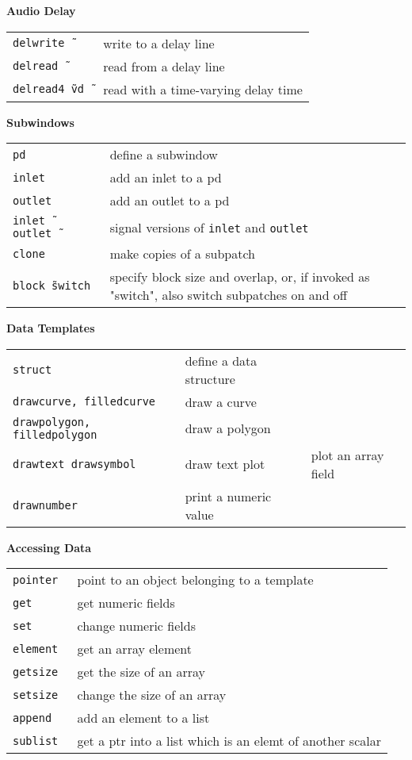 \documentclass[a4paper, landscape, 10pt]{article}
\newcommand{\refcardtitle}[1]{
  \begin{center}
    \textbf{\small{#1}}
  \end{center}
}
\begin{document}
\begin{multicols}{3}
  \refcardtitle{Audio Delay}
  \begin{tabularx}{9cm}{>{\tt}l X}
    delwrite\~\ & write to a delay line \\
    delread\~\ & read from a delay line \\
    delread4\~\ vd\~\ & read with a time-varying delay time \\
  \end{tabularx}

  \refcardtitle{Subwindows}
  \begin{tabularx}{9cm}{>{\tt}l X}
    pd & define a subwindow \\
    inlet & add an inlet to a pd \\
    outlet & add an outlet to a pd \\
    inlet\~\, outlet\~\ & signal versions of \texttt{inlet} and \texttt{outlet} \\
    clone & make copies of a subpatch \\
    block\~\ switch & specify block size and overlap, or, if invoked as "switch", also switch subpatches on and off \\
  \end{tabularx}

  \refcardtitle{Data Templates}
  \begin{tabularx}{9cm}{>{\tt}l X}
    struct & define a data structure \\
    drawcurve, filledcurve & draw a curve \\
    drawpolygon, filledpolygon & draw a polygon \\
    drawtext drawsymbol & draw text
    plot & plot an array field \\
    drawnumber & print a numeric value \\
  \end{tabularx}

  \refcardtitle{Accessing Data}
  \begin{tabularx}{9cm}{>{\tt}l X}
    pointer & point to an object belonging to a template \\
    get & get numeric fields \\
    set & change numeric fields \\
    element & get an array element \\
    getsize & get the size of an array \\
    setsize & change the size of an array \\
    append & add an element to a list \\
    sublist & get a ptr into a list which is an elemt of another scalar \\
  \end{tabularx}

\end{multicols}
\end{document}
